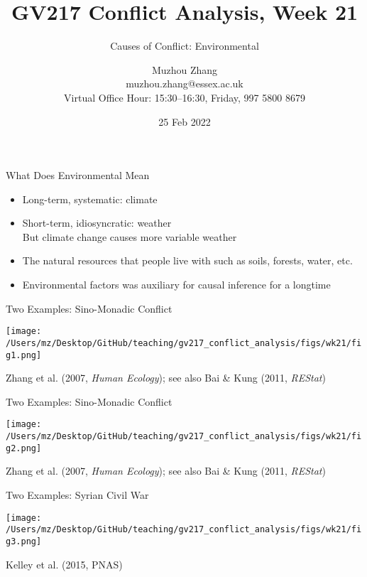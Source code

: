 \documentclass{beamer}
\title{GV217 Conflict Analysis, Week 21}
\subtitle{Causes of Conflict: Environmental}
\author{Muzhou Zhang\\ muzhou.zhang@essex.ac.uk\\ Virtual Office Hour: 15:30--16:30, Friday, 997 5800 8679}
\date{25 Feb 2022}
\begin{document}
\maketitle
{}

\begin{frame}{What Does Environmental Mean}
    \begin{itemize}
        \pause\item Long-term, systematic: climate
        \pause\item Short-term, idiosyncratic: weather\\
        \pause      But climate change causes more variable weather
        \pause\item The natural resources that people live with
        \pause      such as soils, forests, water, etc.
        \pause\item Environmental factors was auxiliary for causal inference for a longtime
    \end{itemize}
\end{frame}

\begin{frame}{Two Examples: Sino-Monadic Conflict}
    \pause
    \begin{center}
        \texttt{[image: /Users/mz/Desktop/GitHub/teaching/gv217\_conflict\_analysis/figs/wk21/fig1.png]}
    \end{center}
    \tiny Zhang et al. (2007, \emph{Human Ecology}); see also Bai \& Kung (2011, \emph{REStat})
\end{frame}

\begin{frame}{Two Examples: Sino-Monadic Conflict}
    \pause
    \begin{center}
        \texttt{[image: /Users/mz/Desktop/GitHub/teaching/gv217\_conflict\_analysis/figs/wk21/fig2.png]}
    \end{center}
    \tiny Zhang et al. (2007, \emph{Human Ecology}); see also Bai \& Kung (2011, \emph{REStat})
\end{frame}

\begin{frame}{Two Examples: Syrian Civil War}
    \pause
    \begin{center}
        \texttt{[image: /Users/mz/Desktop/GitHub/teaching/gv217\_conflict\_analysis/figs/wk21/fig3.png]}
    \end{center}
    \tiny Kelley et al. (2015, PNAS) 
\end{frame}
\end{document}
